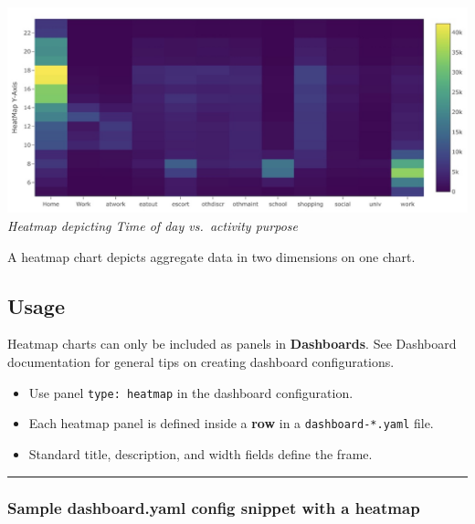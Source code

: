 \includegraphics{assets/heatmap-chart.jpg} \emph{Heatmap depicting Time
of day vs.~activity purpose}

A heatmap chart depicts aggregate data in two dimensions on one chart.

\hypertarget{usage}{%
\subsection{Usage}\label{usage}}

Heatmap charts can only be included as panels in \textbf{Dashboards}.
See Dashboard documentation for general tips on creating dashboard
configurations.

\begin{itemize}
\tightlist
\item
  Use panel \texttt{type:\ heatmap} in the dashboard configuration.
\item
  Each heatmap panel is defined inside a \textbf{row} in a
  \texttt{dashboard-*.yaml} file.
\item
  Standard title, description, and width fields define the frame.
\end{itemize}

\begin{center}\rule{0.5\linewidth}{0.5pt}\end{center}

\hypertarget{sample-dashboard.yaml-config-snippet-with-a-heatmap}{%
\subsubsection{Sample dashboard.yaml config snippet with a
heatmap}\label{sample-dashboard.yaml-config-snippet-with-a-heatmap}}

